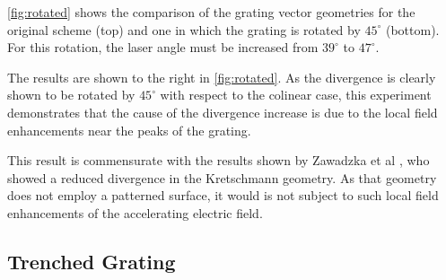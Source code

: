 \ref{fig:rotated} shows the comparison of the grating vector geometries for the original scheme (top) and one in which the grating is rotated by $45^{\circ}$ (bottom).
For this rotation, the laser angle must be increased from $39^{\circ}$ to $47^{\circ}$.

The results are shown to the right in \ref{fig:rotated}.
As the divergence is clearly shown to be rotated by $45^{\circ}$ with respect to the colinear case, this experiment demonstrates that the cause of the divergence increase is due to the local field enhancements near the peaks of the grating.

This result is commensurate with the results shown by Zawadzka et al \cite{zawadzka_evanescent_2001}, who showed a reduced divergence in the Kretschmann geometry.
As that geometry does not employ a patterned surface, it would is not subject to such local field enhancements of the accelerating electric field.

\subsection{Trenched Grating}
